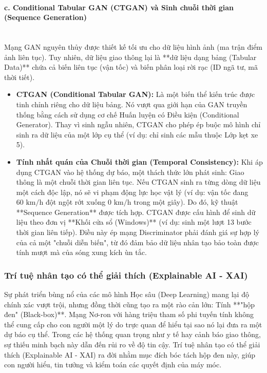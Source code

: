 \paragraph{c. Conditional Tabular GAN (CTGAN) và Sinh chuỗi thời gian (Sequence Generation)} \mbox{} \\
Mạng GAN nguyên thủy được thiết kế tối ưu cho dữ liệu hình ảnh (ma trận điểm ảnh liên tục). Tuy nhiên, dữ liệu giao thông lại là **dữ liệu dạng bảng (Tabular Data)** chứa cả biến liên tục (vận tốc) và biến phân loại rời rạc (ID ngã tư, mã thời tiết).
\begin{itemize}
    \item \textbf{CTGAN (Conditional Tabular GAN):} Là một biến thể kiến trúc được tinh chỉnh riêng cho dữ liệu bảng. Nó vượt qua giới hạn của GAN truyền thống bằng cách sử dụng cơ chế Huấn luyện có Điều kiện (Conditional Generator). Thay vì sinh ngẫu nhiên, CTGAN cho phép ép buộc mô hình chỉ sinh ra dữ liệu của một lớp cụ thể (ví dụ: chỉ sinh các mẫu thuộc Lớp kẹt xe 5).
    \item \textbf{Tính nhất quán của Chuỗi thời gian (Temporal Consistency):} Khi áp dụng CTGAN vào hệ thống dự báo, một thách thức lớn phát sinh: Giao thông là một chuỗi thời gian liên tục. Nếu CTGAN sinh ra từng dòng dữ liệu một cách độc lập, nó sẽ vi phạm động lực học vật lý (ví dụ: vận tốc đang $60\text{ km/h}$ đột ngột rớt xuống $0\text{ km/h}$ trong một giây). Do đó, kỹ thuật **Sequence Generation** được tích hợp. CTGAN được cấu hình để sinh dữ liệu theo đơn vị **Khối cửa sổ (Windows)** (ví dụ: sinh một lượt 13 bước thời gian liên tiếp). Điều này ép mạng Discriminator phải đánh giá sự hợp lý của cả một "chuỗi diễn biến", từ đó đảm bảo dữ liệu nhân tạo bảo toàn được tính mượt mà của sóng xung kích ùn tắc.
\end{itemize}

\subsubsection{Trí tuệ nhân tạo có thể giải thích (Explainable AI - XAI)}
Sự phát triển bùng nổ của các mô hình Học sâu (Deep Learning) mang lại độ chính xác vượt trội, nhưng đồng thời cũng tạo ra một rào cản lớn: Tính **"hộp đen" (Black-box)**. Mạng Nơ-ron với hàng triệu tham số phi tuyến tính không thể cung cấp cho con người một lý do trực quan để hiểu tại sao nó lại đưa ra một dự báo cụ thể. Trong các hệ thống quan trọng như y tế hay cảnh báo giao thông, sự thiếu minh bạch này dẫn đến rủi ro về độ tin cậy. Trí tuệ nhân tạo có thể giải thích (Explainable AI - XAI) ra đời nhằm mục đích bóc tách hộp đen này, giúp con người hiểu, tin tưởng và kiểm toán các quyết định của máy móc.

